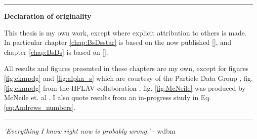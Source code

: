 \begin{titlepage}
\begin{vcenterpage}
\noindent\rule[2pt]{\textwidth}{0.5pt}
\begin{center}
{\large\textbf{Declaration of originality}}
\end{center}
This thesis is my own work, except where explicit attribution to others is made. In particular chapter \ref{chap:BsDsstar} is based on the now published [{}], and chapter \ref{chap:BsDs} is based on [{}].

All results and figures presented in these chapters are my own, except for figures \ref{fig:ckmpdg} and \ref{fig:alpha_s} which are courtesy of the Particle Data Group \cite{PhysRevD.98.030001}, fig. \ref{fig:ckmpdg} from the HFLAV collaboration \cite{HFLAV16}, fig. \ref{fig:McNeile} was produced by McNeile et. al \cite{McNeile:2012qf}. I also quote results from an in-progress study \cite{Colquhoun:2016osw} in Eq. \eqref{eq:Andrews_numbers}.
    
\noindent\rule[2pt]{\textwidth}{0.5pt}
\end{vcenterpage}

\cleardoublepage

\thispagestyle{empty}

\begin{center}
  \emph{'Everything I know right now is probably wrong.'} - wdbm
\end{center}

\end{titlepage}
\sloppy

\titlepage

